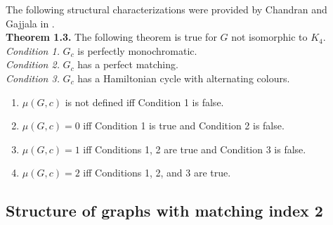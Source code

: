 \documentclass[11pt]{article}
\begin{document}
The following structural characterizations were provided by Chandran and Gajjala in \cite{chandran_gajjala1000}.\\
\textbf{Theorem 1.3.} The following theorem is true for $G$ not isomorphic to $K_4$.\\
\textit{Condition 1.} $G_c$ is perfectly monochromatic.\\
\textit{Condition 2.} $G_c$ has a perfect matching.\\
\textit{Condition 3.} $G_c$ has a Hamiltonian cycle with alternating colours.
\begin{enumerate}
    \item $\mu(G,c)$ is not defined iff Condition 1 is false.\vspace{-0.2cm}
    \item $\mu(G,c)=0$ iff Condition 1 is true and Condition 2 is false.\vspace{-0.2cm}
    \item $\mu(G,c)=1$ iff Conditions 1, 2 are true and Condition 3 is false.\vspace{-0.2cm}
    \item $\mu(G,c)=2$ iff Conditions 1, 2, and 3 are true.
\end{enumerate}

\subsection*{Structure of graphs with matching index 2}
\end{document}
